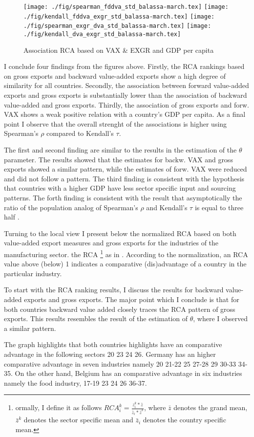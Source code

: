\begin{figure}[H]
\caption{Association RCA based on VAX \& EXGR and GDP per capita }
\centering
\texttt{[image: ./fig/spearman\_fddva\_std\_balassa-march.tex]}
\texttt{[image: ./fig/kendall\_fddva\_exgr\_std\_balassa-march.tex]}
\texttt{[image: ./fig/spearman\_exgr\_dva\_std\_balassa-march.tex]}
\texttt{[image: ./fig/kendall\_dva\_exgr\_std\_balassa-march.tex]}
\end{figure}
I conclude four findings from the figures above.
Firstly, the RCA rankings based on gross exports and backward value-added exports show a high degree of similarity for all countries.
Secondly, the association between forward value-added exports and gross exports is substantially lower than the association of backward value-added and gross exports.
Thirdly,  the association of gross exports and forw. VAX shows a weak positive relation with a country's GDP per capita.
As a final point I observe that the overall strenght of the associations is higher using  Spearman's $\rho$ compared to Kendall's $\tau$. \par
The first and second finding are similar to the results in the estimation of the $\theta$ parameter.
The results showed that the estimates for backw. VAX and gross exports showed a similar pattern, while the estimates of forw. VAX were reduced and did not follow a pattern.
The third finding is consistent with the hypothesis that countries with a higher GDP have less sector specific input and sourcing patterns.
The forth finding is consistent with the result that asymptotically the ratio of the population analog of Spearman's $\rho$ and Kendall's $\tau$ is equal to three half \parencite{fredricks2007}. \par
Turning to the local view  I present below the normalized RCA based on both value-added export measures and gross exports for the industries of the manufacturing sector.
the RCA \footnote{ ormally, I define it as follows $RCA_{i}^{k}=\frac{ z^k_i * \bar{z} }{\bar{z}_i * \bar{z}^k}$, where $\bar{z}$ denotes the grand mean, $\bar{z}^k$ denotes the sector specific mean and $\bar{z}_i$ denotes the country specific mean.} as in \textcite{leromain2014}.
According to the normalization, an RCA  value above (below) 1 indicates a comparative (dis)advantage of a country in the particular industry.
 \par
To start with the RCA ranking results, I discuss the results for backward value-added exports and gross exports.
The major point which I conclude is that for both countries backward value added closely traces the RCA pattern of gross exports.
This results resembles the result of the estimation of $\theta$, where I observed a similar pattern. \par
The graph highlights that both countries highlights have an comparative advantage in the following sectors 20 23 24 26.
Germany has an higher comparative advantage in seven industries namely 20 21-22 25 27-28 29 30-33 34-35.
On the other hand, Belgium has an comparative advantage in six industries namely the food industry, 17-19 23 24 26 36-37.

